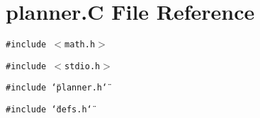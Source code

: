 \section{planner.C File Reference}
\label{planner_C}
{\tt \#include $<$math.h$>$}\par
{\tt \#include $<$stdio.h$>$}\par
{\tt \#include \char`\"{}planner.h\char`\"{}}\par
{\tt \#include \char`\"{}defs.h\char`\"{}}\par

